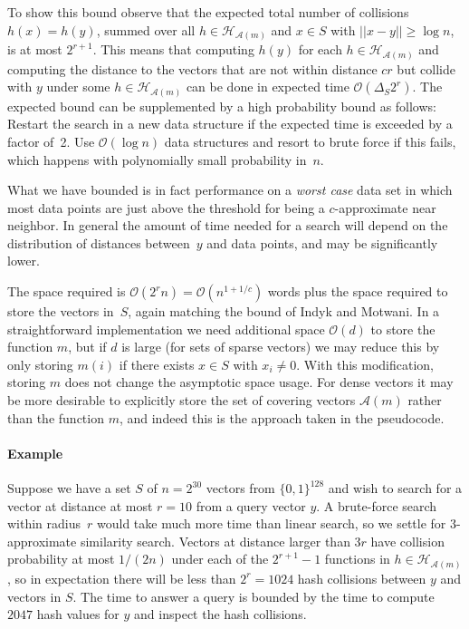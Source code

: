 \documentclass[prodmode,acmtalg]{acmsmall}
\newcommand{\Osymbol}{{\mathcal O}}
\newcommand{\BO}[1]{\Osymbol\left(#1\right)}
\begin{document}
To show this bound observe that the expected total number of collisions $h(x)=h(y)$, summed over all $h\in \mathcal{H}_{\mathcal{A}(m)}$ and $x\in S$ with $||x-y||\geq \log n$, is at most $2^{r+1}$.
This means that computing $h(y)$ for each $h\in \mathcal{H}_{\mathcal{A}(m)}$ and computing the distance to the vectors that are not within distance $cr$ but collide with $y$ under some $h\in \mathcal{H}_{\mathcal{A}(m)}$ can be done in expected time $\BO{\Delta_S 2^r}$.
The expected bound can be supplemented by a high probability bound as follows: Restart the search in a new data structure if the expected time is exceeded by a factor of~2. Use $\BO{\log n}$ data structures and resort to brute force if this fails, which happens with polynomially small probability in~$n$.

What we have bounded is in fact performance on a \emph{worst case} data set in which most data points are just above the threshold for being a $c$-approximate near neighbor.
In general the amount of time needed for a search will depend on the distribution of distances between~$y$ and data points, and may be significantly lower.

The space required is $\BO{2^r n} = \BO{n^{1+1/c}}$ words plus the space required to store the vectors in~$S$, again matching the bound of Indyk and Motwani.
In a straightforward implementation we need additional space $\BO{d}$ to store the function $m$, but if $d$ is large (for sets of sparse vectors) we may reduce this by only storing $m(i)$ if there exists $x\in S$ with $x_i \ne 0$.
With this modification, storing $m$ does not change the asymptotic space usage.
For dense vectors it may be more desirable to explicitly store the set of covering vectors $\mathcal{A}(m)$ rather than the function $m$, and indeed this is the approach taken in the pseudocode.


\medskip

\paragraph{Example} Suppose we have a set $S$ of $n=2^{30}$ vectors from $\{0,1\}^{128}$ and wish to search for a vector at distance at most $r=10$ from a query vector $y$.
A brute-force search within radius~$r$ would take much more time than linear search, so we settle for $3$-approximate similarity search.
Vectors at distance larger than $3r$ have collision probability at most $1/(2n)$ under each of the $2^{r+1}-1$ functions in $h\in \mathcal{H}_{\mathcal{A}(m)}$, so in expectation there will be less than $2^r = 1024$ hash collisions between $y$ and vectors in $S$. 
The time to answer a query is bounded by the time to compute $2047$ hash values for $y$ and inspect the hash collisions.
\end{document}
